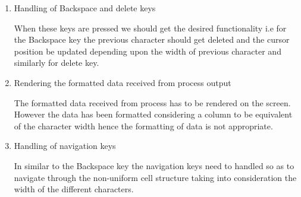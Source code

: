 \begin{enumerate}
\item Handling of Backspace and delete keys

When these keys are pressed we should get the desired functionality i.e for the Backspace key the previous character should get deleted and the cursor position be updated depending upon the width of previous character and similarly for delete key.

\item Rendering the formatted data received from process output

The formatted data received from process has to be rendered on the screen. However the data has been formatted considering a column to be equivalent of the character width hence the formatting of data is not appropriate.

\item Handling of navigation keys

In similar to the Backspace key the navigation keys need to handled so as to navigate through the non-uniform cell structure taking into consideration the width of the different characters.
\end{enumerate}



